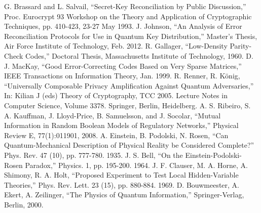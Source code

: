 \documentclass[conference]{IEEEtran}
\begin{document}
\begin{thebibliography}{26}
  G. Brassard and L. Salvail, ``Secret-Key Reconciliation by Public Discussion,'' Proc. Eurocrypt 93 Workshop on the Theory and Application of Cryptographic Techniques, pp. 410-423, 23-27 May 1993.
  J. Johnson, ``An Analysis of Error Reconciliation Protocols for Use in Quantum Key Distribution,'' Master's Thesis, Air Force Institute of Technology, Feb. 2012.
  R. Gallager, ``Low-Density Parity-Check Codes,'' Doctoral Thesis, Massachusetts Institute of Technology, 1960.
  D. J. MacKay, ``Good Error-Correcting Codes Based on Very Sparse Matrices,'' IEEE Transactions on Information Theory, Jan. 1999.
  R. Renner, R. K\"onig, ``Universally Composable Privacy Amplification Against Quantum Adversaries,'' In: Kilian J (eds) Theory of Cryptography, TCC 2005. Lecture Notes in Computer Science, Volume 3378. Springer, Berlin, Heidelberg.
  A. S. Ribeiro, S. A. Kauffman, J. Lloyd-Price, B. Samuelsson, and J. Socolar, ``Mutual Information in Random Boolean Models of Regulatory Networks,'' Physical Review E, 77(1):011901, 2008.
  A. Einstein, B. Podolski, N. Rosen, ``Can Quantum-Mechanical Description of Physical Reality be Considered Complete?'' Phys. Rev. 47 (10), pp. 777-780. 1935.
  J. S. Bell, ``On the Einstein-Podolski-Rosen Paradox,'' Physics. 1, pp. 195-200. 1964.
  J. F. Clauser, M. A. Horne, A. Shimony, R. A. Holt, ``Proposed Experiment to Test Local Hidden-Variable Theories,'' Phys. Rev. Lett. 23 (15), pp. 880-884. 1969.
  D. Bouwmeester, A. Ekert, A. Zeilinger, ``The Physics of Quantum Information,'' Springer-Verlag, Berlin, 2000.
\end{thebibliography}

\end{document}
